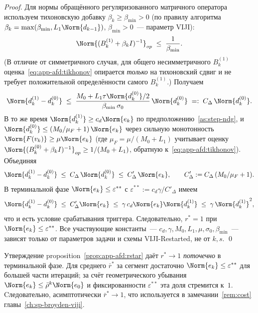 \begin{proof}
Для нормы обращённого регуляризованного матричного оператора
используем тихоновскую добавку $\beta_k \ge \beta_{\min} > 0$
(по правилу алгоритма $\beta_k = \max(\beta_{\min}, L_1\Norm{d_{k-1}})$,
$\beta_{\min} > 0$~--- параметр VIJI):
\begin{equation}
\Norm{(B_k^{(1)} + \beta_k I)^{-1}}_{op}
\;\le\;
\frac{1}{\beta_{\min}}.
\label{eq:app-afd:tikhonov}
\end{equation}
(В отличие от симметричного случая, для общего несимметричного
$B_k^{(1)}$ оценка~\eqref{eq:app-afd:tikhonov} опирается \emph{только}
на тихоновский сдвиг и не требует положительной определённости
самого $B_k^{(1)}$.) Получаем
\[
\Norm{d^{(1)}_k - d^{(0)}_k}
\;\le\;
\frac{M_0 + L_1\tau\Norm{d^{(0)}_k}/2}{\beta_{\min}\,\sigma_0}\,\Norm{d^{(0)}_k}
\;=:\;
C_{\Delta}\,\Norm{d^{(0)}_k}.
\]
В то же время $\Norm{d^{(1)}_k} \ge c_d \Norm{e_k}$ по
предположению~\ref{as:step-ndg}, и
$\Norm{d^{(0)}_k} \le (M_0/\mu_F + 1)\,\Norm{e_k}$ через сильную
монотонность $\Norm{F(v_k)} \ge \mu\Norm{e_k}$ (где $\mu_F = \mu/(M_0+L_1)$
учитывает оценку $\Norm{(B_k^{(0)} + \beta_k I)^{-1}}_{op} \ge 1/(M_0 + L_1)$,
обратную к~\eqref{eq:app-afd:tikhonov}). Объединяя
\[
\Norm{d^{(1)}_k - d^{(0)}_k}
\;\le\;
C_{\Delta}\,\Norm{d^{(0)}_k}
\;\le\;
C'_{\Delta}\,\Norm{e_k},
\qquad
C'_{\Delta} := C_{\Delta}\,(M_0/\mu_F + 1).
\]
В терминальной фазе $\Norm{e_k} \le \varepsilon^{**}$ с
$\varepsilon^{**} := c_d \gamma / C'_{\Delta}$ имеем
\[
\Norm{d^{(1)}_k - d^{(0)}_k}
\;\le\;
C'_{\Delta} \Norm{e_k}
\;\le\;
\gamma\, c_d \Norm{e_k}\Norm{d^{(1)}_k}
\;\le\;
\gamma\,\Norm{d^{(1)}_k}^{2},
\]
что и есть условие срабатывания триггера.
Следовательно, $r^{*} = 1$ при $\Norm{e_k} \le \varepsilon^{**}$.
Все участвующие константы~--- $c_d, \gamma, M_0, L_1, \mu, \sigma_0,
\beta_{\min}$~--- зависят только от параметров задачи и схемы
VIJI-Restarted, не от $k, s$.
\qed
\end{proof}

\begin{remark}
\label{rem:app-afd:avg-rstar}
Утверждение proposition~\ref{prop:app-afd:rstar} даёт $r^{*} \to 1$
\emph{поточечно} в терминальной фазе. Для среднего $\bar r^{*}$ за
сегмент достаточно $\Norm{e_k} \le \varepsilon^{**}$ для большей
части итераций; за счёт геометрического убывания
$\Norm{e_k}\le \bar\rho^k\Norm{e_0}$ и фиксированности $\varepsilon^{**}$
эта доля стремится к~$1$. Cледовательно, асимптотически
$\bar r^{*} \to 1$, что используется в замечании~\ref{rem:cost}
главы~\ref{ch:sp-broyden-viji}.
\end{remark}

